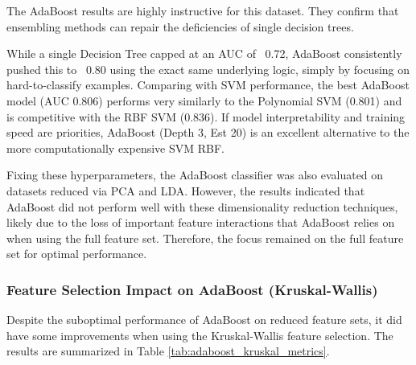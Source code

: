 \documentclass[12pt,a4paper]{article}
\begin{document}
The AdaBoost results are highly instructive for this dataset. They confirm that ensembling methods can repair the deficiencies of single decision trees.

While a single Decision Tree capped at an AUC of ~0.72, AdaBoost consistently pushed this to ~0.80 using the exact same underlying logic, simply by focusing on hard-to-classify examples. Comparing with SVM performance, the best AdaBoost model (AUC 0.806) performs very similarly to the Polynomial SVM (0.801) and is competitive with the RBF SVM (0.836). If model interpretability and training speed are priorities, AdaBoost (Depth 3, Est 20) is an excellent alternative to the more computationally expensive SVM RBF.


Fixing these hyperparameters, the AdaBoost classifier was also evaluated on datasets reduced via PCA and LDA. However, the results indicated that AdaBoost did not perform well with these dimensionality reduction techniques, likely due to the loss of important feature interactions that AdaBoost relies on when using the full feature set. Therefore, the focus remained on the full feature set for optimal performance.

\subsubsection*{Feature Selection Impact on AdaBoost (Kruskal-Wallis)}
Despite the suboptimal performance of AdaBoost on reduced feature sets, it did have some improvements when using the Kruskal-Wallis feature selection. The results are summarized in Table \ref{tab:adaboost_kruskal_metrics}.
\end{document}
